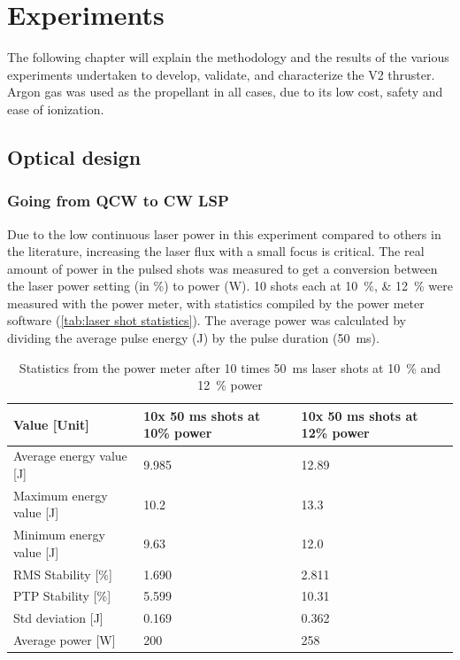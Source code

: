\chapter{Experiments}

    The following chapter will explain the methodology and the results of the various experiments undertaken to develop, validate, and characterize the V2 thruster. Argon gas was used as the propellant in all cases, due to its low cost, safety and ease of ionization.

    \section{Optical design}

        \subsection{Going from QCW to CW LSP}

            Due to the low continuous laser power in this experiment compared to others in the literature, increasing the laser flux with a small focus is critical. The real amount of power in the pulsed shots was measured to get a conversion between the laser power setting (in \%) to power (W). 10 shots each at \qtylist{10; 12}{\%} were measured with the power meter, with statistics compiled by the power meter software (\autoref{tab:laser shot statistics}). The average power was calculated by dividing the average pulse energy (J) by the pulse duration (\qty{50}{ms}).

            \begin{table}[!ht]
                \caption{Statistics from the power meter after 10 times \qty{50}{ms} laser shots at \qty{10}{\%} and \qty{12}{\%} power}
                \label{tab:laser shot statistics}
                \begin{tabular}{lll}
                \textbf{Value {[}Unit{]}} & \textbf{10x 50 ms shots at 10\% power} & \textbf{10x 50 ms shots at 12\% power} \\ \hline
                Average energy value {[}J{]}  & 9.985 & 12.89 \\
                Maximum energy value {[}J{]}  & 10.2  & 13.3  \\
                Minimum energy value {[}J{]}  & 9.63  & 12.0  \\
                RMS Stability {[}\%{]} & 1.690 & 2.811 \\
                PTP Stability {[}\%{]} & 5.599 & 10.31 \\
                Std deviation {[}J{]}  & 0.169 & 0.362 \\
                Average power {[}W{]}  & 200 & 258  \\ \hline
                \end{tabular}
            \end{table}
            
